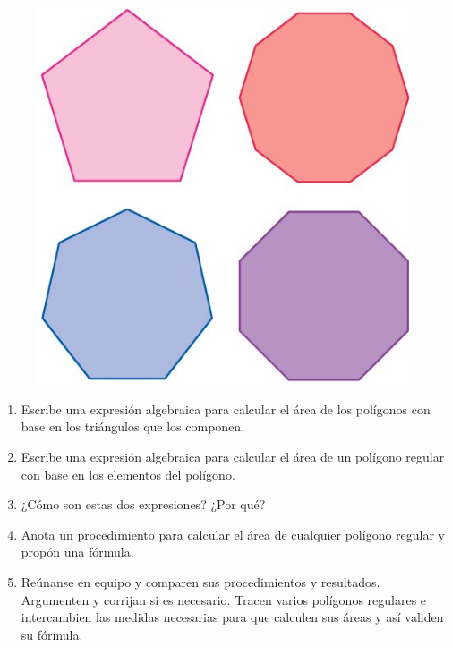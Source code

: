\documentclass[11pt]{book}
\begin{document}
\begin{enumerate}
        \begin{minipage}[t]{0.35\textwidth}
          \begin{figure}[H]
            \centering
            \includegraphics[width=\linewidth]{11.jpg}
            \label{fig:11}
          \end{figure}
        \end{minipage}\hfill
        \begin{minipage}[t]{0.55\textwidth}
          \begin{enumerate}
            \item Escribe una expresión algebraica para calcular el área de los polígonos con base en los triángulos que los componen.
            \item Escribe una expresión algebraica para calcular el área de un polígono regular con base en los elementos del polígono.
            \item ¿Cómo son estas dos expresiones? ¿Por qué?
            \item Anota un procedimiento para calcular el área de cualquier polígono regular y propón una fórmula.
            \item Reúnanse en equipo y comparen sus procedimientos y resultados. Argumenten y corrijan si es necesario. Tracen varios polígonos regulares e intercambien las medidas necesarias para que calculen sus áreas y así validen su fórmula.
          \end{enumerate}
        \end{minipage}


\end{enumerate}
\end{document}
